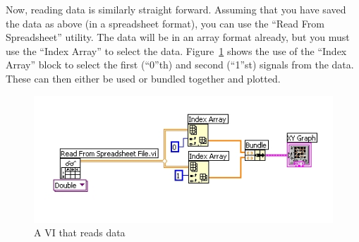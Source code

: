 Now, reading data is similarly straight forward.  Assuming that you have saved
the data as above (in a spreadsheet format), you can use the ``Read From
Spreadsheet'' utility.  The data will be in an array format already, but you
must use the ``Index Array'' to select the data.  Figure~\ref{fig-readdata1}
shows the use of the ``Index Array'' block to select the first (``0''th) and
second (``1''st) signals from the data.  These can then either be used or
bundled together and plotted.

\begin{figure}[h!]
\centering
\includegraphics[width=5in]{saveread/read1}
\caption{A VI that reads data}
\label{fig-readdata1}
\end{figure}





